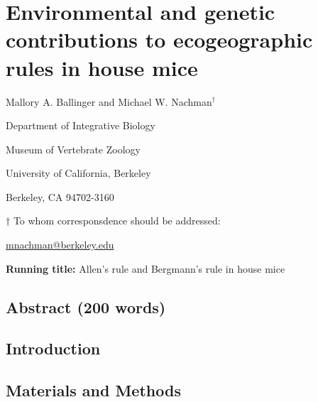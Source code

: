 \documentclass[]{article}
\author{}
\date{\vspace{-2.5em}}
\begin{document}
\hypertarget{environmental-and-genetic-contributions-to-ecogeographic-rules-in-house-mice}{%
\section{Environmental and genetic contributions to ecogeographic rules
in house
mice}\label{environmental-and-genetic-contributions-to-ecogeographic-rules-in-house-mice}}

\vspace{20mm}

Mallory A. Ballinger and Michael W. Nachman\({^\dagger}\)

\vspace{20mm}

Department of Integrative Biology

Museum of Vertebrate Zoology

University of California, Berkeley

Berkeley, CA 94702-3160

\vspace{10mm}

\({\dagger}\) To whom corresponsdence should be addressed:

\href{mailto:mnachman@berkeley.edu}{mnachman@berkeley.edu}

\vspace{40mm}

\textbf{Running title:} Allen's rule and Bergmann's rule in house mice

\newpage

\hypertarget{abstract-200-words}{%
\subsection{Abstract (200 words)}\label{abstract-200-words}}

\newpage

\hypertarget{introduction}{%
\subsection{Introduction}\label{introduction}}

\newpage

\hypertarget{materials-and-methods}{%
\subsection{Materials and Methods}\label{materials-and-methods}}

\newpage
\end{document}
